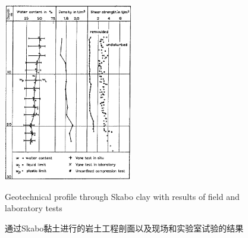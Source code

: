 \begin{figure}[!h]
    \centering
    \includegraphics[width=0.5\textwidth]{figures/figure-1.png}
    \caption{Geotechnical profile through Skabo clay with results of field and laboratory tests}
    \addtocounter{figure}{-1}
    \vspace{-5pt}
    \renewcommand{\figurename}{图}
    \caption{通过Skabo黏土进行的岩土工程剖面以及现场和实验室试验的结果}
    \renewcommand{\figurename}{Figure}
    \label{figure:1}
\end{figure}
